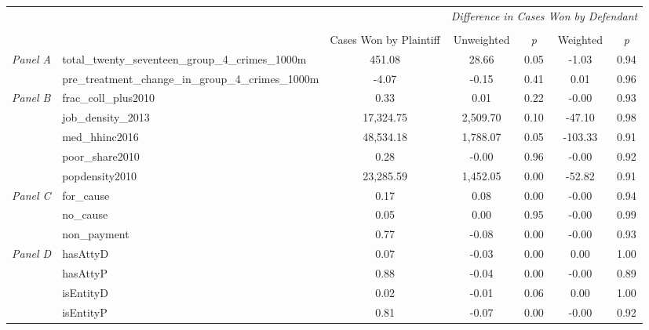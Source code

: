 \begin{tabular}{llccccc}
\toprule
 &  & \textit{} & \multicolumn{4}{c}{\textit{Difference in Cases Won by Defendant}} \\
\cline{4-7}
\\
 &  & Cases Won by Plaintiff & Unweighted & \emph{p} & Weighted & \emph{p} \\
\midrule
\multirow[c]{2}{3cm}{\textit{Panel A}} & total_twenty_seventeen_group_4_crimes_1000m & 451.08 & 28.66 & 0.05 & -1.03 & 0.94 \\
 & pre_treatment_change_in_group_4_crimes_1000m & -4.07 & -0.15 & 0.41 & 0.01 & 0.96 \\
\cline{1-7}
\multirow[c]{5}{3cm}{\textit{Panel B}} & frac_coll_plus2010 & 0.33 & 0.01 & 0.22 & -0.00 & 0.93 \\
 & job_density_2013 & 17,324.75 & 2,509.70 & 0.10 & -47.10 & 0.98 \\
 & med_hhinc2016 & 48,534.18 & 1,788.07 & 0.05 & -103.33 & 0.91 \\
 & poor_share2010 & 0.28 & -0.00 & 0.96 & -0.00 & 0.92 \\
 & popdensity2010 & 23,285.59 & 1,452.05 & 0.00 & -52.82 & 0.91 \\
\cline{1-7}
\multirow[c]{3}{3cm}{\textit{Panel C}} & for_cause & 0.17 & 0.08 & 0.00 & -0.00 & 0.94 \\
 & no_cause & 0.05 & 0.00 & 0.95 & -0.00 & 0.99 \\
 & non_payment & 0.77 & -0.08 & 0.00 & -0.00 & 0.93 \\
\cline{1-7}
\multirow[c]{4}{3cm}{\textit{Panel D}} & hasAttyD & 0.07 & -0.03 & 0.00 & 0.00 & 1.00 \\
 & hasAttyP & 0.88 & -0.04 & 0.00 & -0.00 & 0.89 \\
 & isEntityD & 0.02 & -0.01 & 0.06 & 0.00 & 1.00 \\
 & isEntityP & 0.81 & -0.07 & 0.00 & -0.00 & 0.92 \\
\cline{1-7}
\bottomrule
\end{tabular}
